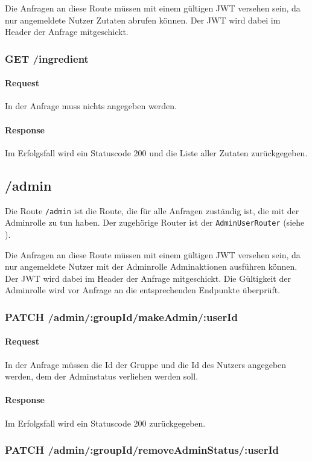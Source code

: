 \documentclass{entwurfsheft}
\begin{document}
Die Anfragen an diese Route müssen mit einem gültigen JWT versehen sein, da nur angemeldete Nutzer Zutaten abrufen können.
Der JWT wird dabei im Header der Anfrage mitgeschickt.


\subsubsection*{GET /ingredient}
\paragraph{Request}
In der Anfrage muss nichts angegeben werden.
\paragraph{Response}
Im Erfolgsfall wird ein Statuscode 200 und die Liste aller Zutaten zurückgegeben.

\subsection{/admin}
Die Route \texttt{/admin} ist die Route, die für alle Anfragen zuständig ist, die mit der Adminrolle zu tun haben.
Der zugehörige Router ist der \texttt{AdminUserRouter} (siehe ).

Die Anfragen an diese Route müssen mit einem gültigen JWT versehen sein, da nur angemeldete Nutzer mit der Adminrolle Adminaktionen ausführen können.
Der JWT wird dabei im Header der Anfrage mitgeschickt.
Die Gültigkeit der Adminrolle wird vor Anfrage an die entsprechenden Endpunkte überprüft.

\subsubsection*{PATCH /admin/:groupId/makeAdmin/:userId}
\paragraph{Request}
In der Anfrage müssen die Id der Gruppe und die Id des Nutzers angegeben werden, dem der Adminstatus verliehen werden soll.
\paragraph{Response}
Im Erfolgsfall wird ein Statuscode 200 zurückgegeben.

\subsubsection*{PATCH /admin/:groupId/removeAdminStatus/:userId}
\end{document}
